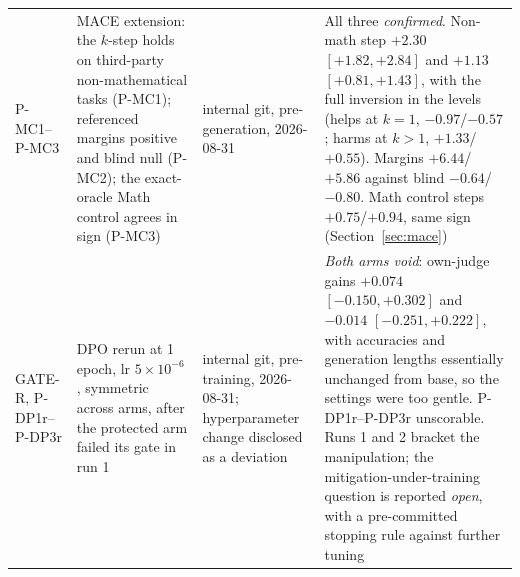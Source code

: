 \documentclass[11pt]{article}
\begin{document}
\begin{longtable}{L{1.7cm}L{5.3cm}L{2.5cm}L{5.1cm}}
\addlinespace[1pt]
P-MC1--P-MC3 & \textsc{MACE} extension: the $k$-step holds on third-party non-mathematical tasks (P-MC1); referenced margins positive and blind null (P-MC2); the exact-oracle Math control agrees in sign (P-MC3) & internal git, pre-generation, 2026-08-31 & All three \emph{confirmed}. Non-math step $+2.30$ $[+1.82,+2.84]$ and $+1.13$ $[+0.81,+1.43]$, with the full inversion in the levels (helps at $k{=}1$, $-0.97$/$-0.57$; harms at $k{>}1$, $+1.33$/$+0.55$). Margins $+6.44$/$+5.86$ against blind $-0.64$/$-0.80$. Math control steps $+0.75$/$+0.94$, same sign (Section~\ref{sec:mace}) \\
\addlinespace[1pt]
GATE-R, P-DP1r--P-DP3r & DPO rerun at 1 epoch, lr $5\times10^{-6}$, symmetric across arms, after the protected arm failed its gate in run 1 & internal git, pre-training, 2026-08-31; hyperparameter change disclosed as a deviation & \emph{Both arms void}: own-judge gains $+0.074$ $[-0.150,+0.302]$ and $-0.014$ $[-0.251,+0.222]$, with accuracies and generation lengths essentially unchanged from base, so the settings were too gentle. P-DP1r--P-DP3r unscorable. Runs 1 and 2 bracket the manipulation; the mitigation-under-training question is reported \emph{open}, with a pre-committed stopping rule against further tuning \\
\end{longtable}
\endgroup
\end{document}

